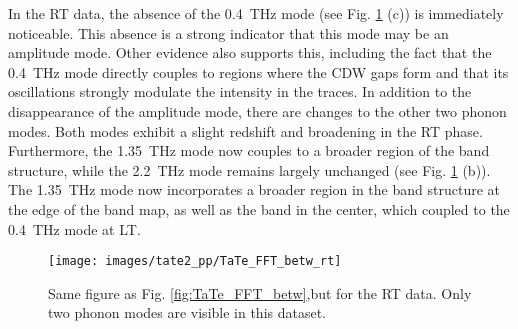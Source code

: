 
In the RT data, the absence of the \qty{0.4}{\tera\hertz} mode (see Fig. \ref{fig:TaTe_FFT_betw_rt} (c)) is immediately noticeable.
This absence is a strong indicator that this mode may be an amplitude mode.
Other evidence also supports this, including the fact that the \qty{0.4}{\tera\hertz} mode directly couples to regions where the CDW gaps form and that its oscillations strongly modulate the intensity in the traces.
In addition to the disappearance of the amplitude mode, there are changes to the other two phonon modes.
Both modes exhibit a slight redshift and broadening in the RT phase.
Furthermore, the \qty{1.35}{\tera\hertz} mode now couples to a broader region of the band structure, while the \qty{2.2}{\tera\hertz} mode remains largely unchanged (see Fig. \ref{fig:TaTe_FFT_betw_rt} (b)).
The \qty{1.35}{\tera\hertz} mode now incorporates a broader region in the band structure at the edge of the band map, as well as the band in the center, which coupled to the \qty{0.4}{\tera\hertz} mode at LT.

\begin{figure}[t]
	\centering
	\texttt{[image: images/tate2\_pp/TaTe\_FFT\_betw\_rt]}
	\caption{Same figure as Fig. \ref{fig:TaTe_FFT_betw},but for the RT data. Only two phonon modes are visible in this dataset.}
	\label{fig:TaTe_FFT_betw_rt}
\end{figure}

